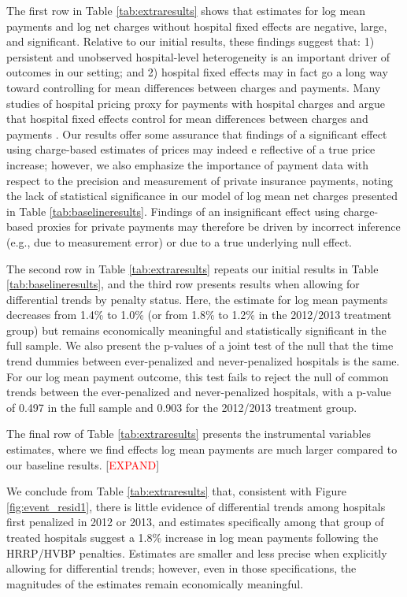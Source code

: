 \documentclass[12pt]{article}
\begin{document}
The first row in Table \ref{tab:extraresults} shows that estimates for log mean payments and log net charges without hospital fixed effects are negative, large, and significant. Relative to our initial results, these findings suggest that: 1) persistent and unobserved hospital-level heterogeneity is an important driver of outcomes in our setting; and 2) hospital fixed effects may in fact go a long way toward controlling for mean differences between charges and payments. Many studies of hospital pricing proxy for payments with hospital charges and argue that hospital fixed effects control for mean differences between charges and payments \citep{cutler2000}. Our results offer some assurance that findings of a significant effect using charge-based estimates of prices may indeed e reflective of a true price increase; however, we also emphasize the importance of payment data with respect to the precision and measurement of private insurance payments, noting the lack of statistical significance in our model of log mean net charges presented in Table \ref{tab:baselineresults}. Findings of an insignificant effect using charge-based proxies for private payments may therefore be driven by incorrect inference (e.g., due to measurement error) or due to a true underlying null effect.

The second row in Table \ref{tab:extraresults} repeats our initial results in Table \ref{tab:baselineresults}, and the third row presents results when allowing for differential trends by penalty status. Here, the estimate for log mean payments decreases from 1.4\% to 1.0\% (or from 1.8\% to 1.2\% in the 2012/2013 treatment group) but remains economically meaningful and statistically significant in the full sample. We also present the p-values of a joint test of the null that the time trend dummies between ever-penalized and never-penalized hospitals is the same. For our log mean payment outcome, this test fails to reject the null of common trends between the ever-penalized and never-penalized hospitals, with a p-value of 0.497 in the full sample and 0.903 for the 2012/2013 treatment group.

The final row of Table \ref{tab:extraresults} presents the instrumental variables estimates, where we find effects log mean payments are much larger compared to our baseline results. [\textcolor{red}{EXPAND}]

We conclude from Table \ref{tab:extraresults} that, consistent with Figure \ref{fig:event_resid1}, there is little evidence of differential trends among hospitals first penalized in 2012 or 2013, and estimates specifically among that group of treated hospitals suggest a 1.8\% increase in log mean payments following the HRRP/HVBP penalties. Estimates are smaller and less precise when explicitly allowing for differential trends; however, even in those specifications, the magnitudes of the estimates remain economically meaningful.
\end{document}
